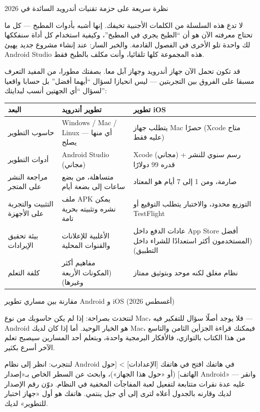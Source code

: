 \begin{center}\small\color{gray}نظرة سريعة على حزمة تقنيات أندرويد السائدة في 2026\end{center}

لا تدع هذه السلسلة من الكلمات الأجنبية تخيفك. إنها أشبه بأدوات المطبخ — كل ما تحتاج معرفته الآن هو أن “الطبخ يجري في المطبخ”، وكيفية استخدام كل أداة سنفككها لك واحدة تلو الأخرى في الفصول القادمة. والخبر السار: عند إنشاء مشروع جديد يهيئ Android Studio هذه المجموعة كلها تلقائيا، وأنت مكلف بالطبخ فقط.


قد تكون تحمل الآن جهاز أندرويد وجهاز آبل معا. بصفتك مطورا، من المفيد التعرف مسبقا على الفروق بين التجربتين — ليس انحيازا لسؤال “أيهما أفضل” بل حسابا واقعيا لسؤال “أي الجهتين أنسب لبدايتك”:

\begin{center}
\begin{tabularx}{\linewidth}{|X|X|X|}
\hline
\textbf{البعد} & \textbf{تطوير أندرويد} & \textbf{تطوير iOS} \tabularnewline
\hline
حاسوب التطوير & Windows / Mac / Linux — أي منها يصلح & يتطلب جهاز Mac حصرًا (Xcode متاح عليه فقط) \tabularnewline
أدوات التطوير & Android Studio (مجاني) & Xcode (مجاني) + رسم سنوي للنشر قدره 99 دولارًا \tabularnewline
مراجعة النشر على المتجر & متساهلة، من بضع ساعات إلى بضعة أيام & صارمة، ومن 1 إلى 7 أيام هو المعتاد \tabularnewline
التثبيت والتجربة على الأجهزة & ملف APK يمكن نشره وتثبيته بحرية تامة & التوزيع محدود، والاختبار يتطلب التوقيع أو TestFlight \tabularnewline
بيئة تحقيق الإيرادات & الأغلبية للإعلانات والقنوات المحلية & عادات الدفع داخل App Store أفضل (المستخدمون أكثر استعدادًا للشراء داخل التطبيق) \tabularnewline
كلفة التعلم & مفاهيم أكثر (المكونات الأربعة وغيرها) & نظام مغلق لكنه موحد وبتوثيق ممتاز \tabularnewline
\hline
\end{tabularx}
\end{center}

\begin{center}\small\color{gray}مقارنة بين مساري تطوير Android و iOS (أغسطس 2026)\end{center}

لنتحدث بصراحة: إذا لم يكن حاسوبك من نوع Mac، فلا يوجد أصلًا سؤال للتفكير فيه — Android هو الخيار الوحيد. أما إذا كان لديك Mac، فيمكنك قراءة الجزأين الثامن والتاسع من هذا الكتاب بالتوازي، فالأفكار البرمجية واحدة، وبتعلم أحد المسارين سيصبح تعلم الآخر أسرع بكثير.

\begin{tcbpractice}{لنتجرب: انظر إلى نظام Android في هاتفك}
افتح في هاتفك [الإعدادات] > [حول الهاتف] (أو «حول هذا الجهاز»)، وابحث عن السطر الخاص بـ«إصدار Android» — وانقر عليه عدة نقرات متتابعة لتفعيل لعبة المفاجآت المخفية في النظام. دوّن رقم الإصدار لديك وقارنه بالجدول أعلاه لترى إلى أي جيل ينتمي. هاتفك هو أول «جهاز اختبار للتطوير» لديك.

\end{tcbpractice}

